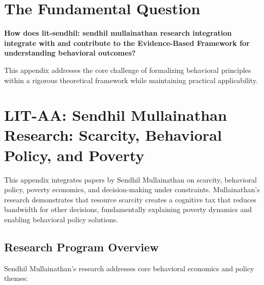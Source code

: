 \section{The Fundamental Question}
\label{sec:mul-fundamental}

\begin{tcolorbox}[
    colback=red!5!white,
    colframe=red!75!black,
    title={\textbf{Fundamental Question}}
]
\textbf{How does lit-sendhil: sendhil mullainathan research integration integrate with and contribute to the
Evidence-Based Framework for understanding behavioral outcomes?}

This appendix addresses the core challenge of formalizing behavioral principles
within a rigorous theoretical framework while maintaining practical applicability.
\end{tcolorbox}





\section{LIT-AA: Sendhil Mullainathan Research: Scarcity, Behavioral Policy, and Poverty}
\label{app:litaa}

This appendix integrates papers by Sendhil Mullainathan on scarcity, behavioral policy, poverty economics, and decision-making under constraints. Mullainathan's research demonstrates that resource scarcity creates a cognitive tax that reduces bandwidth for other decisions, fundamentally explaining poverty dynamics and enabling behavioral policy solutions.

\subsection{Research Program Overview}

Sendhil Mullainathan's research addresses core behavioral economics and policy themes:

